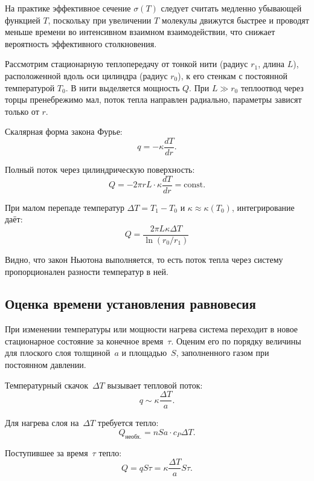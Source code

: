 \documentclass[a4paper,12pt]{article} %
\begin{document}
На практике эффективное сечение $\sigma(T)$ следует считать медленно убывающей функцией $T$, поскольку при увеличении $T$ молекулы движутся быстрее и проводят меньше времени во интенсивном взаимном взаимодействии, что снижает вероятность эффективного столкновения.

\medskip

Рассмотрим стационарную теплопередачу от тонкой нити (радиус $r_1$, длина $L$), расположенной вдоль оси цилиндра (радиус $r_0$), к его стенкам с постоянной температурой $T_0$. В нити выделяется мощность $Q$. При $L \gg r_0$ теплоотвод через торцы пренебрежимо мал, поток тепла направлен радиально, параметры зависят только от $r$.

Скалярная форма закона Фурье:
\begin{equation}
    q = -\kappa \frac{dT}{dr}.
\end{equation}

Полный поток через цилиндрическую поверхность:
\begin{equation}
    Q = -2\pi r L \cdot \kappa \frac{dT}{dr} = \text{const}.
\end{equation}

При малом перепаде температур $\Delta T = T_1 - T_0$ и $\kappa \approx \kappa(T_0)$, интегрирование даёт:
\begin{equation}
    Q = \frac{2\pi L \kappa \Delta T}{\ln(r_0 / r_1)}
    \label{Q}
\end{equation}

Видно, что закон Ньютона выполняется, то есть поток тепла через систему пропорционален разности температур в
ней.

\subsection*{Оценка времени установления равновесия}

При изменении температуры или мощности нагрева система переходит в новое стационарное состояние за конечное время~$\tau$. Оценим его по порядку величины для плоского слоя толщиной~$a$ и площадью~$S$, заполненного газом при постоянном давлении. 

Температурный скачок~$\Delta T$ вызывает тепловой поток:
\[
q \sim \kappa \frac{\Delta T}{a}.
\]

Для нагрева слоя на~$\Delta T$ требуется тепло:
\[
Q_\text{необх.} = n S a \cdot c_P \Delta T.
\]

Поступившее за время~$\tau$ тепло:
\[
Q = q S \tau = \kappa \frac{\Delta T}{a} S \tau.
\]
\end{document}
